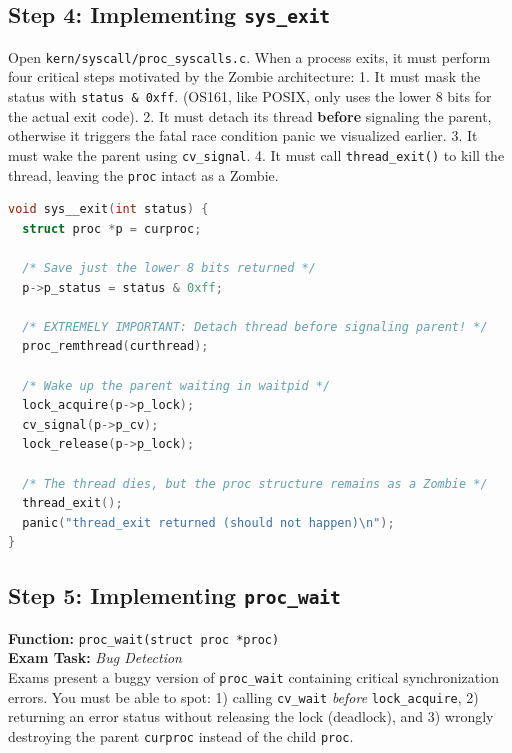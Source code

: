 \subsection{Step 4: Implementing \texttt{sys\_exit}}
Open \texttt{kern/syscall/proc\_syscalls.c}. When a process exits, it must perform four critical steps motivated by the Zombie architecture:
1. It must mask the status with \texttt{status \& 0xff}. (OS161, like POSIX, only uses the lower 8 bits for the actual exit code).
2. It must detach its thread \textbf{before} signaling the parent, otherwise it triggers the fatal race condition panic we visualized earlier.
3. It must wake the parent using \texttt{cv\_signal}.
4. It must call \texttt{thread\_exit()} to kill the thread, leaving the \texttt{proc} intact as a Zombie.
\begin{lstlisting}[language=C]
void sys__exit(int status) {
  struct proc *p = curproc;
  
  /* Save just the lower 8 bits returned */
  p->p_status = status & 0xff; 
  
  /* EXTREMELY IMPORTANT: Detach thread before signaling parent! */
  proc_remthread(curthread);
  
  /* Wake up the parent waiting in waitpid */
  lock_acquire(p->p_lock);
  cv_signal(p->p_cv);
  lock_release(p->p_lock);

  /* The thread dies, but the proc structure remains as a Zombie */
  thread_exit();
  panic("thread_exit returned (should not happen)\n");
}
\end{lstlisting}

\subsection{Step 5: Implementing \texttt{proc\_wait}}

\begin{tcolorbox}[colback=red!5!white, colframe=red!75!black, title=\textbf{! EXAM FOCUS: IMPLEMENTATION REQUIRED}]
\textbf{Function:} \texttt{proc\_wait(struct proc *proc)} \\
\textbf{Exam Task:} \textit{Bug Detection} \\
Exams present a buggy version of \texttt{proc\_wait} containing critical synchronization errors. You must be able to spot: 1) calling \texttt{cv\_wait} \textit{before} \texttt{lock\_acquire}, 2) returning an error status without releasing the lock (deadlock), and 3) wrongly destroying the parent \texttt{curproc} instead of the child \texttt{proc}.
\end{tcolorbox}

